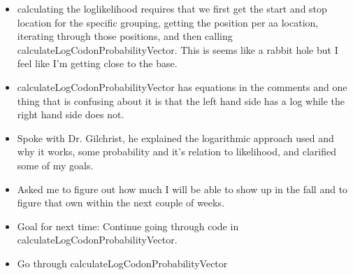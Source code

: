 \documentclass[letterpaper,index=totoc,hyperref,openany]{labbook} %
\begin{document}
\begin{itemize}
	\item calculating the loglikelihood requires that we first get the start and stop location for the specific grouping, getting the position per aa location, iterating through those positions, and then calling calculateLogCodonProbabilityVector. This is seems like a rabbit hole but I feel like I'm getting close to the base.
	\item calculateLogCodonProbabilityVector has equations in the comments and one thing that is confusing about it is that the left hand side has a log while the right hand side does not. 
	\item Spoke with Dr. Gilchrist, he explained the logarithmic approach used and why it works, some probability and it's relation to likelihood, and clarified some of my goals.
	\item Asked me to figure out how much I will be able to show up in the fall and to figure that own within the next couple of weeks.
	\item Goal for next time: Continue going through code in calculateLogCodonProbabilityVector.
\end{itemize}


\begin{itemize}
	\item Go through calculateLogCodonProbabilityVector
\end{itemize}

\end{document}
